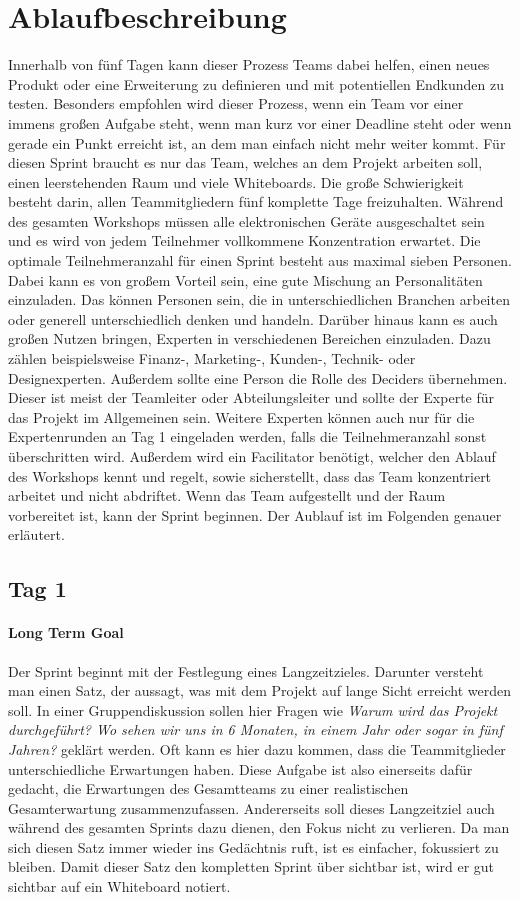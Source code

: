 \section{Ablaufbeschreibung}
Innerhalb von fünf Tagen kann dieser Prozess Teams dabei helfen, einen neues Produkt oder eine Erweiterung zu definieren und mit potentiellen Endkunden zu testen. Besonders empfohlen wird dieser Prozess, wenn ein Team vor einer immens großen Aufgabe steht, wenn man kurz vor einer Deadline steht oder wenn gerade ein Punkt erreicht ist, an dem man einfach nicht mehr weiter kommt. Für diesen Sprint braucht es nur das Team, welches an dem Projekt arbeiten soll, einen leerstehenden Raum und viele Whiteboards. Die große Schwierigkeit besteht darin, allen Teammitgliedern fünf komplette Tage  freizuhalten. Während des gesamten Workshops müssen alle elektronischen Geräte ausgeschaltet sein und es wird von jedem Teilnehmer vollkommene Konzentration erwartet. Die optimale Teilnehmeranzahl für einen Sprint besteht aus maximal sieben Personen. Dabei kann es von großem Vorteil sein, eine gute Mischung an Personalitäten einzuladen. Das können Personen sein, die in unterschiedlichen Branchen arbeiten oder generell unterschiedlich denken und handeln. Darüber hinaus kann es auch großen Nutzen bringen, Experten in verschiedenen Bereichen einzuladen. Dazu zählen beispielsweise Finanz-, Marketing-, Kunden-, Technik- oder Designexperten. Außerdem sollte eine Person die Rolle des Deciders übernehmen. Dieser ist meist der Teamleiter oder Abteilungsleiter und sollte der Experte für das Projekt im Allgemeinen sein. Weitere Experten können auch nur für die Expertenrunden an Tag 1 eingeladen werden, falls die Teilnehmeranzahl sonst überschritten wird. Außerdem wird ein Facilitator benötigt, welcher den Ablauf des Workshops kennt und regelt, sowie sicherstellt, dass das Team konzentriert arbeitet und nicht abdriftet. Wenn das Team aufgestellt und der Raum vorbereitet ist, kann der Sprint beginnen. Der Aublauf ist im Folgenden genauer erläutert.

\subsection*{Tag 1}
\paragraph{Long Term Goal}
Der Sprint beginnt mit der Festlegung eines Langzeitzieles. Darunter versteht man einen Satz, der aussagt, was mit dem Projekt auf lange Sicht erreicht werden soll. In einer Gruppendiskussion sollen hier Fragen wie \textit{Warum wird das Projekt durchgeführt? Wo sehen wir uns in 6 Monaten, in einem Jahr oder sogar in fünf Jahren?} geklärt werden. Oft kann es hier dazu kommen, dass die Teammitglieder unterschiedliche Erwartungen haben. Diese Aufgabe ist also einerseits dafür gedacht, die Erwartungen des Gesamtteams zu einer realistischen Gesamterwartung zusammenzufassen. Andererseits soll dieses Langzeitziel auch während des gesamten Sprints dazu dienen, den Fokus nicht zu verlieren. Da man sich diesen Satz immer wieder ins Gedächtnis ruft, ist es einfacher, fokussiert zu bleiben. Damit dieser Satz den kompletten Sprint über sichtbar ist, wird er gut sichtbar auf ein Whiteboard notiert. 

